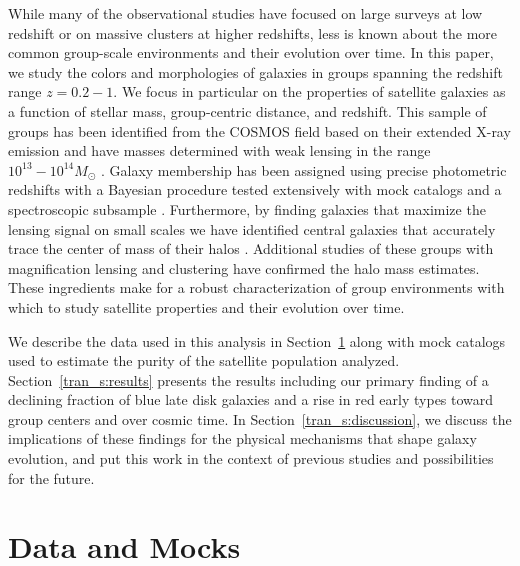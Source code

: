 While many of the observational studies have focused on large surveys
at low redshift or on massive clusters at higher redshifts, less is
known about the more common group-scale environments and their
evolution over time. In this paper, we study the colors and
morphologies of galaxies in groups spanning the redshift range
$z=0.2-1$. We focus in particular on the properties of satellite
galaxies as a function of stellar mass, group-centric distance, and
redshift. This sample of groups has been identified from the COSMOS
field \citep{Scoville2007a} based on their extended X-ray emission and
have masses determined with weak lensing in the range $10^{13}-10^{14}
M_{\odot}$ \citep{Leauthaud2010}. Galaxy membership has been assigned
using precise photometric redshifts with a Bayesian procedure
tested extensively with mock catalogs and a spectroscopic subsample
\citep{George2011}. Furthermore, by finding galaxies that maximize the
lensing signal on small scales we have identified central galaxies
that accurately trace the center of mass of their halos
\citep{George2012}. Additional studies of these
  groups with magnification lensing
\citep{Ford2012, Schmidt2012} and clustering \citep{Allevato2012} have
confirmed the halo mass estimates. These ingredients make for a robust
characterization of group environments with which to study satellite
properties and their evolution over time.

We describe the data used in this analysis in Section~\ref{tran_s:data}
along with mock catalogs used to estimate the purity of the satellite
population analyzed. Section~\ref{tran_s:results} presents the results
including our primary finding of a declining fraction of blue late
disk galaxies and a rise in red early types toward group centers and
over cosmic time. In Section~\ref{tran_s:discussion}, we discuss the
implications of these findings for the physical mechanisms that shape
galaxy evolution, and put this work in the context of previous studies
and possibilities for the future.


\section{Data and Mocks}
\label{tran_s:data}

